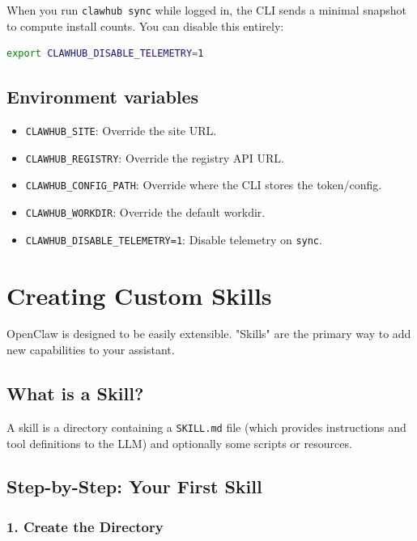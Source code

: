 When you run \texttt{clawhub sync} while logged in, the CLI sends a minimal snapshot to compute install counts. You can disable this entirely:

\begin{lstlisting}[language=bash]
export CLAWHUB_DISABLE_TELEMETRY=1
\end{lstlisting}


\subsection{Environment variables}


\begin{itemize}
  \item \texttt{CLAWHUB\_SITE}: Override the site URL.
  \item \texttt{CLAWHUB\_REGISTRY}: Override the registry API URL.
  \item \texttt{CLAWHUB\_CONFIG\_PATH}: Override where the CLI stores the token/config.
  \item \texttt{CLAWHUB\_WORKDIR}: Override the default workdir.
  \item \texttt{CLAWHUB\_DISABLE\_TELEMETRY=1}: Disable telemetry on \texttt{sync}.
\end{itemize}



\clearpage

\section{Creating Custom Skills}


OpenClaw is designed to be easily extensible. "Skills" are the primary way to add new capabilities to your assistant.

\subsection{What is a Skill?}


A skill is a directory containing a \texttt{SKILL.md} file (which provides instructions and tool definitions to the LLM) and optionally some scripts or resources.

\subsection{Step-by-Step: Your First Skill}


\subsubsection{1. Create the Directory}


